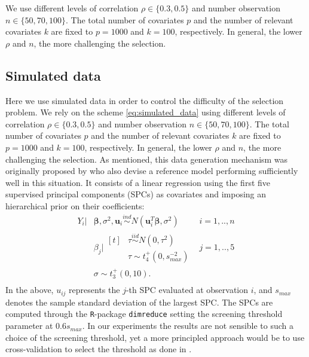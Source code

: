 \documentclass[american,]{article}
\theoremstyle{definition}
\begin{document}
We use different levels of correlation $\rho\in\{0.3,0.5\}$ and number
observation $n\in\{50,70,100\}$. The total number of covariates $p$
and the number of relevant covariates $k$ are fixed to $p = 1000$ and
$k = 100$, respectively. In general, the lower $\rho$ and $n$, the
more challenging the selection.


\hypertarget{simulated-data}{%
\subsection{Simulated data}\label{simulated-data}}

Here we use simulated data in order to control the difficulty of the
selection problem. We rely on the scheme \eqref{eq:simulated_data}
using different levels of correlation $\rho\in\{0.3,0.5\}$ and number
observation $n\in\{50,70,100\}$. The total number of covariates $p$
and the number of relevant covariates $k$ are fixed to $p = 1000$ and
$k = 100$, respectively. In general, the lower $\rho$ and $n$, the
more challenging the selection. As mentioned, this data generation
mechanism was originally proposed by \cite{paper:projpred} who also
devise a reference model performing sufficiently well in this
situation. It consists of a linear regression using the first five
supervised principal components (SPCs) \citep{bair2006prediction,
  piironen2018} as covariates and imposing an hierarchical prior on
their coefficients: \
\begin{equation}
\label{eq:ref_mod}
\begin{aligned}
    Y_{i}|&\boldsymbol{\beta},\sigma^{2},\boldsymbol{u}_{i} \overset{ind}{\sim} N(\boldsymbol{u}_{i}^{T}\boldsymbol{\beta},\sigma^{2}) \quad &i=1,..,n \\
    &\beta_{j}|\!\begin{aligned}[t] &\tau \overset{iid}{\sim} N(0,\tau^{2})\\
    &\tau \sim t_{4}^{+}(0,s_{max}^{-2}) 
    \end{aligned} &j=1,..,5 \\ 
    &\sigma \sim t_{3}^{+}(0,10). \\
\end{aligned}
\end{equation}
In the above, $u_{ij}$ represents the $j$-th SPC evaluated at
observation $i$, and $s_{max}$ denotes the sample standard deviation
of the largest SPC.  The SPCs are computed through the
\texttt{R}-package \texttt{dimreduce} setting the screening threshold
parameter at $0.6s_{max}$.  In our experiments the results are not
sensible to such a choice of the screening threshold, yet a more
principled approach would be to use cross-validation to select the
threshold as done in \cite{paper:projpred}.
\end{document}
